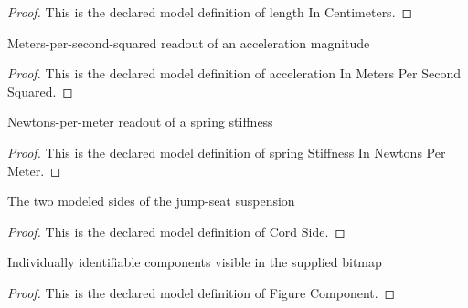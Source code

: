 \begin{proof}
  This is the declared model definition of length In Centimeters.
\end{proof}
\begin{definition}
  \label{def:physics:phyx-mini-0283:phyxminiproblems-problemphyxmini0283-accelerationinmeterspersecondsquared}
  Meters-per-second-squared readout of an acceleration magnitude
\end{definition}
\begin{proof}
  This is the declared model definition of acceleration In Meters Per Second Squared.
\end{proof}
\begin{definition}
  \label{def:physics:phyx-mini-0283:phyxminiproblems-problemphyxmini0283-springstiffnessinnewtonspermeter}
  Newtons-per-meter readout of a spring stiffness
\end{definition}
\begin{proof}
  This is the declared model definition of spring Stiffness In Newtons Per Meter.
\end{proof}
\begin{definition}
  \label{def:physics:phyx-mini-0283:phyxminiproblems-problemphyxmini0283-cordside}
  The two modeled sides of the jump-seat suspension
\end{definition}
\begin{proof}
  This is the declared model definition of Cord Side.
\end{proof}
\begin{definition}
  \label{def:physics:phyx-mini-0283:phyxminiproblems-problemphyxmini0283-figurecomponent}
  Individually identifiable components visible in the supplied bitmap
\end{definition}
\begin{proof}
  This is the declared model definition of Figure Component.
\end{proof}
